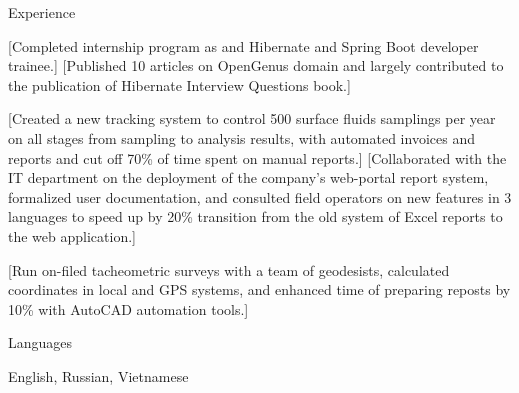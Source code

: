 \documentclass[10pt,a4paper,oneside]{letter} %
\begin{document}
	\begin{resumeSection}{Experience }

			[Completed internship program as and Hibernate and Spring Boot developer trainee.]
			[Published 10 articles on OpenGenus domain and largely contributed to the publication of Hibernate Interview Questions book.]

			[Created a new tracking system to control 500 surface fluids samplings per year on all stages from sampling to analysis results, with automated invoices and reports and cut off 70\% of time spent on manual reports.]
			[Collaborated with the IT department on the deployment of the company's web-portal report system, formalized user documentation, and consulted field operators on new features in 3 languages to speed up by 20\% transition from the old system of Excel reports to the web application.]


			[Run on-filed tacheometric surveys with a team of geodesists, calculated coordinates in local and GPS systems, and enhanced time of preparing reposts by 10\% with AutoCAD automation tools.]
	\end{resumeSection}
	
	\begin{resumeSection}{Languages }

		English, Russian, Vietnamese
	\end{resumeSection}
	
\end{document}
